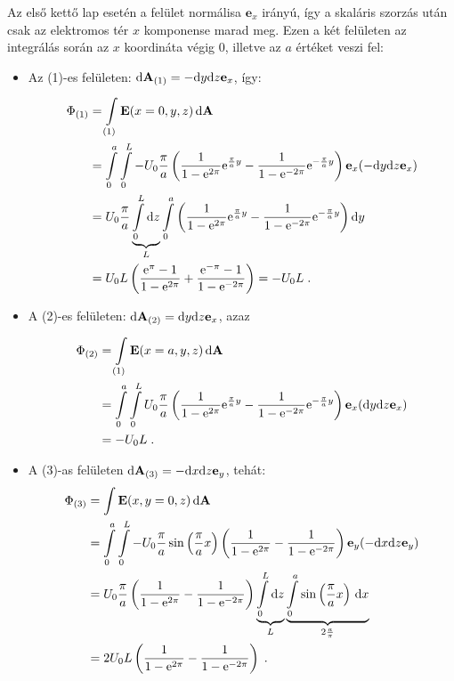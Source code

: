 Az első kettő lap esetén a felület normálisa $\mathbf{e}_x$ irányú, így a skaláris szorzás után csak az elektromos tér $x$ komponense marad meg. Ezen a két felületen az integrálás során az $x$ koordináta végig $0$, illetve az $a$ értéket veszi fel:
\begin{itemize}
 \item 
  Az (1)-es felületen: $\mathrm{d}\mathbf{A}_{(1)}=-\mathrm{d} y\mathrm{d} z \mathbf{e}_x$, így:
  \begin{align}
   \Phi_{(1)}
    &=\int\limits_{(1)}^{} \mathbf{E}(x=0,y,z)\,\mathrm{d}\mathbf{A}
   \\
    &=
     \int\limits_{0}^{a}\int\limits_{0}^{L} -U_0 \frac{\pi}{a} \left(\frac{1}{1-\mathrm{e}^{2\pi}}\mathrm{e}^{\frac{\pi}{a}y} - \frac{1}{1-\mathrm{e}^{-2\pi}}\mathrm{e}^{-\frac{\pi}{a}y}\right) \mathbf{e}_x (-\mathrm{d} y\mathrm{d} z \mathbf{e}_x) 
   \\
    &=
     U_0 \frac{\pi}{a}\underbrace{\int\limits_{0}^{L}  \mathrm{d} z}_{L}\int\limits_{0}^{a}\left(\frac{1}{1-\mathrm{e}^{2\pi}}\mathrm{e}^{\frac{\pi}{a}y} - \frac{1}{1-\mathrm{e}^{-2\pi}}\mathrm{e}^{-\frac{\pi}{a}y}\right)\mathrm{d} y
   \\
    &=
     U_0 L\left(\frac{\mathrm{e}^\pi-1}{1-\mathrm{e}^{2\pi}} + \frac{\mathrm{e}^{-\pi}-1}{1-\mathrm{e}^{-2\pi}}\right)
     =
     -U_0 L
   \;. 
  \end{align}

 \item 
  A (2)-es felületen: $\mathrm{d}\mathbf{A}_{(2)}=\mathrm{d} y\mathrm{d} z \mathbf{e}_x$, azaz
  \begin{align}
   \Phi_{(2)}
    &=\int\limits_{(1)}^{} \mathbf{E}(x=a,y,z)\,\mathrm{d}\mathbf{A}
   \\
    &=
     \int\limits_{0}^{a}\int\limits_{0}^{L} U_0 \frac{\pi}{a} \left(\frac{1}{1-\mathrm{e}^{2\pi}}\mathrm{e}^{\frac{\pi}{a}y} - \frac{1}{1-\mathrm{e}^{-2\pi}}\mathrm{e}^{-\frac{\pi}{a}y}\right) \mathbf{e}_x (\mathrm{d} y\mathrm{d} z \mathbf{e}_x) 
   \\
    &=
     -U_0 L
   \;. 
  \end{align}

 \item 
  A (3)-as felületen $\mathrm{d}\mathbf{A}_{(3)}=-\mathrm{d} x\mathrm{d} z \mathbf{e}_y$, tehát:
  \begin{align}
   \Phi_{(3)}
    &=\int\mathbf{E}(x,y=0,z)\,\mathrm{d}\mathbf{A}
   \\
    &=
     \int\limits_{0}^{a}\int\limits_{0}^{L} -U_0 \frac{\pi}{a}\sin\left(\frac{\pi}{a}x\right) \left(\frac{1}{1-\mathrm{e}^{2\pi}} - \frac{1}{1-\mathrm{e}^{-2\pi}}\right) \mathbf{e}_y (-\mathrm{d}x\mathrm{d}z\mathbf{e}_y) 
   \\
    &=
     U_0 \frac{\pi}{a}\left(\frac{1}{1-\mathrm{e}^{2\pi}} - \frac{1}{1-\mathrm{e}^{-2\pi}}\right) \underbrace{\int\limits_{0}^{L}\mathrm{d}z}_{L} 
     \underbrace{\int\limits_{0}^{a}\sin\left(\frac{\pi}{a}x\right)\,\mathrm{d}x}_{2\frac{a}{\pi}} 
   \\
    &=
     2U_0L  \left(\frac{1}{1-\mathrm{e}^{2\pi}} - \frac{1}{1-\mathrm{e}^{-2\pi}}\right)\;. 
  \end{align}


\end{itemize}
